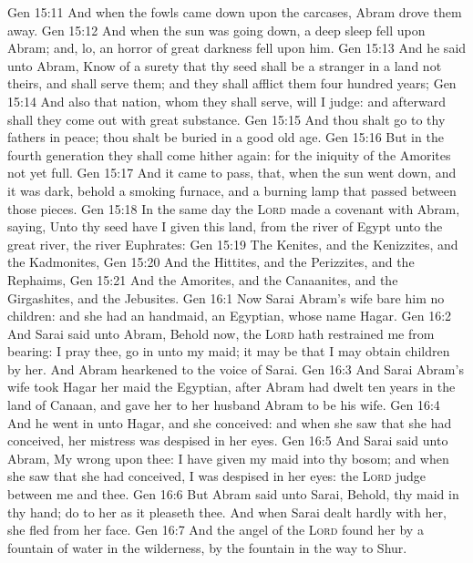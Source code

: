 \vs Gen 15:11 And when the fowls came down upon the carcases, Abram drove them away.
\vs Gen 15:12 And when the sun was going down, a deep sleep fell upon Abram; and, lo, an horror of great darkness fell upon him.
\vs Gen 15:13 And he said unto Abram, Know of a surety that thy seed shall be a stranger in a land  not theirs, and shall serve them; and they shall afflict them four hundred years;
\vs Gen 15:14 And also that nation, whom they shall serve, will I judge: and afterward shall they come out with great substance.
\vs Gen 15:15 And thou shalt go to thy fathers in peace; thou shalt be buried in a good old age.
\vs Gen 15:16 But in the fourth generation they shall come hither again: for the iniquity of the Amorites  not yet full.
\vs Gen 15:17 And it came to pass, that, when the sun went down, and it was dark, behold a smoking furnace, and a burning lamp that passed between those pieces.
\vs Gen 15:18 In the same day the \textsc{Lord} made a covenant with Abram, saying, Unto thy seed have I given this land, from the river of Egypt unto the great river, the river Euphrates:
\vs Gen 15:19 The Kenites, and the Kenizzites, and the Kadmonites,
\vs Gen 15:20 And the Hittites, and the Perizzites, and the Rephaims,
\vs Gen 15:21 And the Amorites, and the Canaanites, and the Girgashites, and the Jebusites.
\vs Gen 16:1 Now Sarai Abram's wife bare him no children: and she had an handmaid, an Egyptian, whose name  Hagar.
\vs Gen 16:2 And Sarai said unto Abram, Behold now, the \textsc{Lord} hath restrained me from bearing: I pray thee, go in unto my maid; it may be that I may obtain children by her. And Abram hearkened to the voice of Sarai.
\vs Gen 16:3 And Sarai Abram's wife took Hagar her maid the Egyptian, after Abram had dwelt ten years in the land of Canaan, and gave her to her husband Abram to be his wife.
\vs Gen 16:4 And he went in unto Hagar, and she conceived: and when she saw that she had conceived, her mistress was despised in her eyes.
\vs Gen 16:5 And Sarai said unto Abram, My wrong  upon thee: I have given my maid into thy bosom; and when she saw that she had conceived, I was despised in her eyes: the \textsc{Lord} judge between me and thee.
\vs Gen 16:6 But Abram said unto Sarai, Behold, thy maid  in thy hand; do to her as it pleaseth thee. And when Sarai dealt hardly with her, she fled from her face.
\vs Gen 16:7 And the angel of the \textsc{Lord} found her by a fountain of water in the wilderness, by the fountain in the way to Shur.
